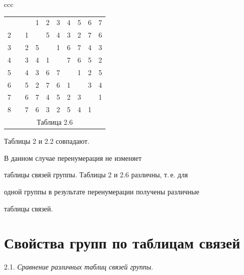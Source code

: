 \begin{center}
\begin{tabular}{ccc}
\begin{tabular}{cccccccccc}
\hline


 1 & \vline & \ & 1 & 2 & 3 & 4 & 5 & 6 & 7 \\


2 & \vline & 1 & \ & 5 & 4 & 3 & 2 & 7 & 6 \\


3 & \vline & 2 & 5 & \ & 1 & 6 & 7 & 4 & 3 \\


4 & \vline & 3 & 4 & 1 & \ & 7 & 6 & 5 & 2 \\


5 & \vline & 4 & 3 & 6 & 7 & \ & 1 & 2 & 5 \\


6 & \vline & 5 & 2 & 7 & 6 & 1 & \ & 3 & 4 \\


7 & \vline & 6 & 7 & 4 & 5 & 2 & 3 & \ & 1 \\


8 & \vline & 7 & 6 & 3 & 2 & 5 & 4 & 1 & \ \\


\multicolumn{10}{c}{ Таблица 2.6}


\end{tabular}





\end{tabular}


\end{center}


\smallskip





\noindent{}Таблицы 2 и 2.2 совпадают. 


В данном случае перенумерация не изменяет 


таблицы связей группы. Таблицы 2 и 2.6 различны, т.\,е. для


одной группы в результате перенумерации получены различные 


таблицы связей.








\section{Свойства групп по таблицам связей}





2.1. {\it Сравнение различных таблиц связей группы}.


